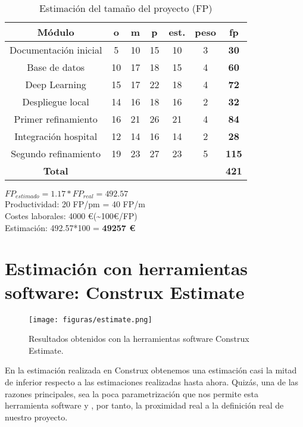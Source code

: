 \begin{table}[H]
	\begin{center}
		\begin{tabular}{|c||c|c|c|c|c|c|}
			\hline 
			Módulo & o & m & p & est. & peso & \textbf{fp} \\
			\hline \hline
			Documentación inicial & 5 & 10 & 15 & 10 & 3 & \textbf{30}  \\ \hline
			Base de datos & 10 & 17 & 18 & 15 & 4 & \textbf{60}  \\ \hline
			Deep Learning & 15 & 17 & 22 & 18 & 4 & \textbf{72}  \\ \hline
			Despliegue local & 14 & 16 & 18 & 16 & 2 & \textbf{32}  \\ \hline
			Primer refinamiento & 16 & 21 & 26 & 21 & 4 & \textbf{84}  \\ \hline
			Integración hospital & 12 & 14 & 16 & 14 & 2 & \textbf{28}  \\ \hline
			Segundo refinamiento & 19 & 23 & 27 & 23 & 5 & \textbf{115}  \\ \hline
			\textbf{Total} & & & & & & \textbf{421}  \\ \hline
		\end{tabular}
		\caption{Estimación del tamaño del proyecto (FP)}
		\label{tabla:FP}
	\end{center}
\end{table}


$FP_{estimado} = 1.17 * FP_{real} = 492.57$ \\
Productividad: 20 FP/pm = 40 FP/m \\
Costes laborales: 4000 \euro (\textasciitilde{}100\euro/FP) \\
Estimación: 492.57*100 = \textbf{49257 \euro} 

\section{Estimación con herramientas software: Construx Estimate}

\begin{figure}[H]
	\centering
	\texttt{[image: figuras/estimate.png]}
	\caption{Resultados obtenidos con la herramientas software Construx Estimate.} 
	\label{fig:estimate}
\end{figure}

En la estimación realizada en Construx obtenemos una estimación casi la mitad de inferior respecto a las estimaciones realizadas hasta ahora. Quizás, una de las razones principales, sea la poca parametrización que nos permite esta herramienta software y , por tanto, la proximidad real a la definición real de nuestro proyecto.

